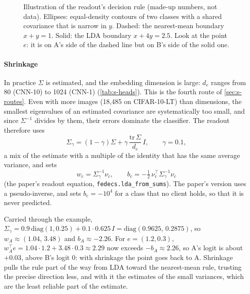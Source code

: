\begin{figure}[t]
\centering
{}
\caption{Illustration of the readout's decision rule (made-up numbers, not data). Ellipses: equal-density contours of
two classes with a shared covariance that is narrow in $y$. Dashed: the nearest-mean boundary $x+y=1$. Solid: the LDA
boundary $x+4y=2.5$. Look at the point $e$: it is on A's side of the dashed line but on B's side of the solid one.}
\label{fig:s-lda}
\end{figure}

\paragraph{Shrinkage} In practice $\Sigma$ is estimated, and the embedding dimension is large: $d_e$ ranges from 80
(CNN-10) to 1024 (CNN-1) (\cref{tab:s-heads}). This is the fourth route of \cref{sec:s-routes}. Even with more images
(18,485 on CIFAR-10-LT) than dimensions, the smallest eigenvalues of an estimated covariance are systematically too
small, and since $\Sigma^{-1}$ divides by them, their errors dominate the classifier. The readout therefore uses
\[
\Sigma_\gamma=(1-\gamma)\Sigma+\gamma\,\frac{\mathrm{tr}\,\Sigma}{d_e}\,I,\qquad\gamma=0.1,
\]
a mix of the estimate with a multiple of the identity that has the same average variance, and sets
\[
w_c=\Sigma_\gamma^{-1}\nu_c,\qquad b_c=-\tfrac12\,\nu_c^\top\Sigma_\gamma^{-1}\nu_c
\]
(the paper's readout equation, \texttt{fedecs.lda\_from\_sums}). The paper's version uses a pseudo-inverse, and sets
$b_c=-10^4$ for a class that no client holds, so that it is never predicted.

Carried through the example, $\Sigma_\gamma=0.9\,\mathrm{diag}(1,0.25)+0.1\cdot0.625\,I=\mathrm{diag}(0.9625,\,0.2875)$,
so $w_A\approx(1.04,\,3.48)$ and $b_A\approx-2.26$. For $e=(1.2,0.3)$, $w_A^\top e=1.04\cdot1.2+3.48\cdot0.3\approx2.29$ now exceeds
$-b_A\approx2.26$, so A's logit is about $+0.03$, above B's logit $0$: with shrinkage the point goes back to A. Shrinkage pulls the
rule part of the way from LDA toward the nearest-mean rule, trusting the precise direction less, and with it the
estimates of the small variances, which are the least reliable part of the estimate.

